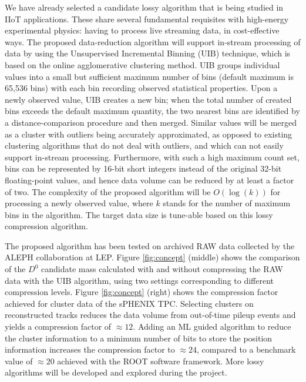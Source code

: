 \vspace{-0.8cm}
We have already selected a candidate lossy algorithm that is being studied in  IIoT applications. These share several fundamental requisites with high-energy experimental physics: having to process live streaming data, in cost-effective ways. The proposed data-reduction algorithm will support in-stream processing of data by using the Unsupervised Incremental Binning (UIB) technique, which is based on the online agglomerative clustering method. UIB groups individual values into a small but sufficient maximum number of bins (default maximum is 65,536 bins) with each bin recording observed statistical properties. Upon a newly observed value, UIB creates a new bin; when the total number of created bins exceeds the default maximum quantity, the two nearest bins are identified by a distance-comparison procedure and then merged. Similar values will be merged as a cluster with outliers being accurately approximated, as opposed to existing clustering algorithms that do not deal with outliers, and which can not easily support in-stream processing. Furthermore, with such a high maximum count set, bins can be represented by 16-bit short integers instead of the original 32-bit floating-point values, and hence data volume can be reduced by at least a factor of two. The complexity of the proposed algorithm will be $O(\log(k))$ for processing a newly observed value, where $k$ stands for the number of maximum bins in the algorithm. The target data size is tune-able based on this lossy compression algorithm. 

The proposed algorithm has been tested on archived RAW data collected by the ALEPH collaboration at LEP. Figure \ref{fig:concept} (middle) shows the comparison of the $D^0$ candidate mass calculated with and without compressing the RAW data with the UIB algorithm, using two settings corresponding to different compression levels. %
Figure \ref{fig:concept} (right) shows the compression factor achieved for cluster data of the sPHENIX TPC. Selecting clusters on reconstructed tracks reduces the data volume from out-of-time pileup events and yields a compression factor of $\approx 12$. Adding an ML guided algorithm to reduce the cluster information to a minimum number of bits to store the position information increases the compression factor to $\approx 24$, compared to a benchmark value of $\approx 20$ achieved with the ROOT software framework. More lossy algorithms will be developed and explored during the project.

